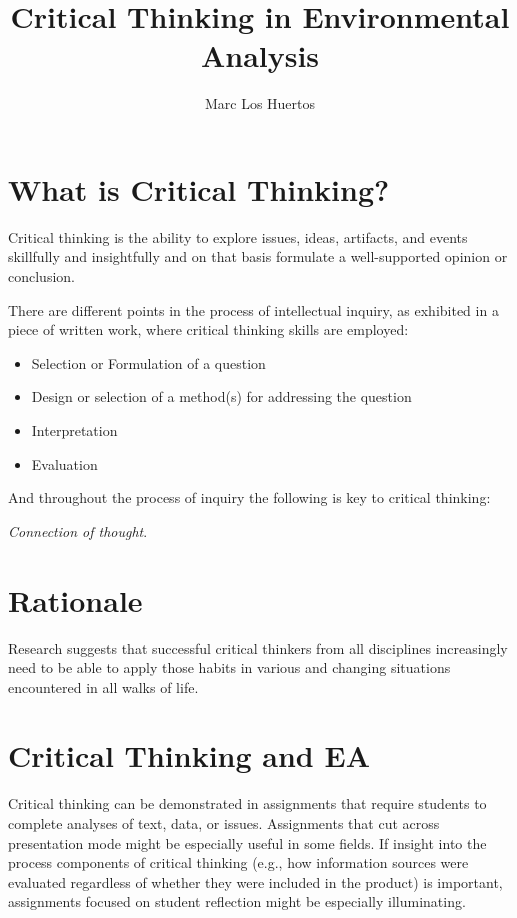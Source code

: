 \documentclass{article}\usepackage[]{graphicx}\usepackage[]{color}
\title{Critical Thinking in Environmental Analysis}
\author{Marc Los Huertos}
\date{}
\begin{document}
\maketitle

\section{What is Critical Thinking?}

Critical thinking is the ability to explore issues, ideas, artifacts, and events skillfully and insightfully and on that basis formulate a well-supported opinion or conclusion.

There are different points in the process of intellectual inquiry, as exhibited in a piece of written work, where critical thinking skills are employed:  

\begin{itemize}
  \item Selection or Formulation of a question\
  \item Design or selection of a method(s) for addressing the question
  \item Interpretation
  \item Evaluation 
\end{itemize}

And throughout the process of inquiry the following is key to critical thinking:

\emph{Connection of thought}. 


\section{Rationale}
Research suggests that successful critical thinkers from all disciplines increasingly need to be able to apply those habits in various and changing situations encountered in all walks of life.

\section{Critical Thinking and EA}

Critical thinking can be demonstrated in assignments that require students to complete analyses of text, data, or issues. Assignments that cut across presentation mode might be especially useful in some fields. If insight into the process components of critical thinking (e.g., how information sources were evaluated regardless of whether they were included in the product) is important, assignments focused on student reflection might be especially illuminating.
\end{document}
